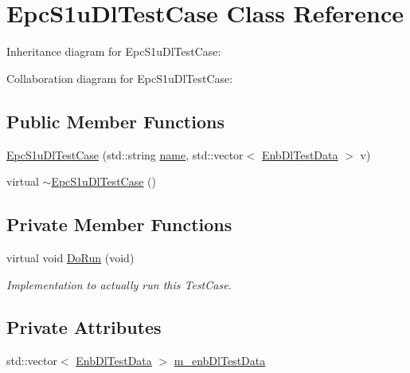 \hypertarget{classEpcS1uDlTestCase}{}\section{Epc\+S1u\+Dl\+Test\+Case Class Reference}
\label{classEpcS1uDlTestCase}


Inheritance diagram for Epc\+S1u\+Dl\+Test\+Case\+:


Collaboration diagram for Epc\+S1u\+Dl\+Test\+Case\+:
\subsection*{Public Member Functions}
\begin{DoxyCompactItemize}
\item 
\hyperlink{classEpcS1uDlTestCase_a2cffa86eedffbb29c7fca838eea9c006}{Epc\+S1u\+Dl\+Test\+Case} (std\+::string \hyperlink{generate__test__data__lte__spectrum__model_8m_ab74e6bf80237ddc4109968cedc58c151}{name}, std\+::vector$<$ \hyperlink{structEnbDlTestData}{Enb\+Dl\+Test\+Data} $>$ v)
\item 
virtual \hyperlink{classEpcS1uDlTestCase_a104ff503167ca03b81e783c272fb6534}{$\sim$\+Epc\+S1u\+Dl\+Test\+Case} ()
\end{DoxyCompactItemize}
\subsection*{Private Member Functions}
\begin{DoxyCompactItemize}
\item 
virtual void \hyperlink{classEpcS1uDlTestCase_a2ac9313672e6c5e2a5a33f98a77ffec2}{Do\+Run} (void)
\begin{DoxyCompactList}\small\item\em Implementation to actually run this Test\+Case. \end{DoxyCompactList}\end{DoxyCompactItemize}
\subsection*{Private Attributes}
\begin{DoxyCompactItemize}
\item 
std\+::vector$<$ \hyperlink{structEnbDlTestData}{Enb\+Dl\+Test\+Data} $>$ \hyperlink{classEpcS1uDlTestCase_a076410c7636f6081aeaab215a0a1bf9d}{m\+\_\+enb\+Dl\+Test\+Data}
\end{DoxyCompactItemize}
